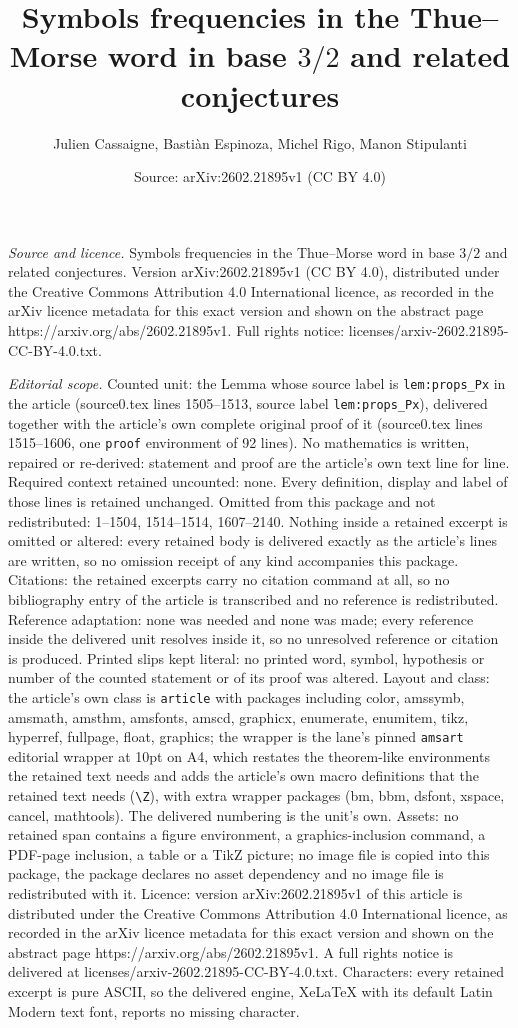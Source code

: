 \documentclass[10pt,a4paper]{amsart}
\title[Symbols frequencies in the Thue--Morse word in base $3/2$ an]{Symbols frequencies in the Thue--Morse word in base $3/2$ and related conjectures}
\author{Julien Cassaigne, Basti\`an Espinoza, Michel Rigo, Manon Stipulanti}
\date{Source: arXiv:2602.21895v1 (CC BY 4.0)}
\begin{document}
\maketitle

\noindent\emph{Source and licence.} Symbols frequencies in the Thue--Morse word in base $3/2$ and related conjectures. Version arXiv:2602.21895v1 (CC BY 4.0), distributed under the Creative Commons Attribution 4.0 International licence, as recorded in the arXiv licence metadata for this exact version and shown on the abstract page https://arxiv.org/abs/2602.21895v1. Full rights notice: licenses/arxiv-2602.21895-CC-BY-4.0.txt.\par\smallskip

\noindent\textit{Editorial scope.} Counted unit: the Lemma whose source label is \texttt{lem:props\_Px} in the article (source0.tex lines 1505--1513, source label \texttt{lem:props\_Px}), delivered together with the article's own complete original proof of it (source0.tex lines 1515--1606, one \texttt{proof} environment of 92 lines). No mathematics is written, repaired or re-derived: statement and proof are the article's own text line for line. Required context retained uncounted: none. Every definition, display and label of those lines is retained unchanged. Omitted from this package and not redistributed: 1--1504, 1514--1514, 1607--2140. Nothing inside a retained excerpt is omitted or altered: every retained body is delivered exactly as the article's lines are written, so no omission receipt of any kind accompanies this package. Citations: the retained excerpts carry no citation command at all, so no bibliography entry of the article is transcribed and no reference is redistributed. Reference adaptation: none was needed and none was made; every reference inside the delivered unit resolves inside it, so no unresolved reference or citation is produced. Printed slips kept literal: no printed word, symbol, hypothesis or number of the counted statement or of its proof was altered. Layout and class: the article's own class is \texttt{article} with packages including color, amssymb, amsmath, amsthm, amsfonts, amscd, graphicx, enumerate, enumitem, tikz, hyperref, fullpage, float, graphics; the wrapper is the lane's pinned \texttt{amsart} editorial wrapper at 10pt on A4, which restates the theorem-like environments the retained text needs and adds the article's own macro definitions that the retained text needs (\texttt{\textbackslash Z}), with extra wrapper packages (bm, bbm, dsfont, xspace, cancel, mathtools). The delivered numbering is the unit's own. Assets: no retained span contains a figure environment, a graphics-inclusion command, a PDF-page inclusion, a table or a TikZ picture; no image file is copied into this package, the package declares no asset dependency and no image file is redistributed with it. Licence: version arXiv:2602.21895v1 of this article is distributed under the Creative Commons Attribution 4.0 International licence, as recorded in the arXiv licence metadata for this exact version and shown on the abstract page https://arxiv.org/abs/2602.21895v1. A full rights notice is delivered at licenses/arxiv-2602.21895-CC-BY-4.0.txt. Characters: every retained excerpt is pure ASCII, so the delivered engine, XeLaTeX with its default Latin Modern text font, reports no missing character.
\end{document}
